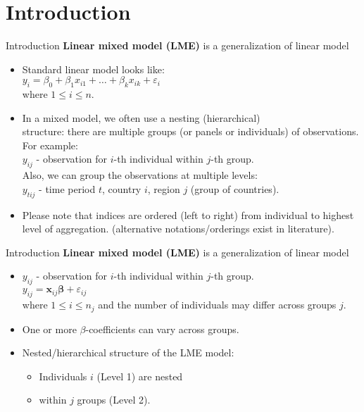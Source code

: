 \documentclass{beamer}
\begin{document}
\section{Introduction}
\begin{frame}{Introduction}
\textbf{Linear mixed model (LME)} is a generalization of linear model
\medskip
\begin{itemize}
\item Standard linear model looks like:\\
\medskip
$y_i = \beta_0 + \beta_1 x_{i1} + \dots + \beta_k x_{ik} + \varepsilon_i$\\
\smallskip
where $ 1 \leq i \leq n$.
\medskip
\item In a mixed model, we often use a nesting (hierarchical) \\structure: there are multiple groups (or panels or individuals) of observations. For example:\\ \medskip
$y_{ij}$ - observation for $i$-th individual within $j$-th group. \\ \smallskip
\medskip
Also, we can group the observations at multiple levels:\\
\medskip
$y_{tij}$ - time period $t$, country $i$, region $j$ (group of countries).\\ 
\bigskip
\item Please note that indices are ordered (left to right) from individual to highest level of aggregation. (alternative notations/orderings exist in literature).
\end{itemize}
\end{frame}
\begin{frame}{Introduction}
\textbf{Linear mixed model (LME)} is a generalization of linear model
\medskip
\begin{itemize}
\item $y_{ij}$ - observation for $i$-th individual within $j$-th group. \\ \smallskip
\medskip
$y_{ij} =  \bm{x}_{ij}\bm{\beta} + \varepsilon_{ij}$\\
\medskip
where $ 1 \leq i \leq n_j$ and the number of individuals may differ across groups $j$.\\ \bigskip
\item One or more $\beta$-coefficients can vary across groups.
\bigskip
\item Nested/hierarchical structure of the LME model:
\medskip
\begin{itemize}
    \item Individuals $i$ (Level 1) are nested
    \medskip
    \item within $j$ groups (Level 2).
\end{itemize}
\end{itemize}
\end{frame}
\end{document}
